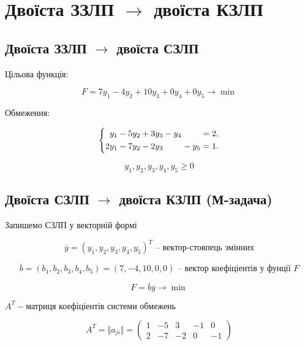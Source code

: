 \documentclass[a4paper, 12pt]{article}
\begin{document}
\section{Двоїста ЗЗЛП $\rightarrow$ двоїста КЗЛП}

\subsection{Двоїста ЗЗЛП $\rightarrow$ двоїста СЗЛП}


Цільова функція:

\begin{equation*}
F = 7y_1 - 4y_2 + 10y_3 + 0y_4 + 0y_5 \rightarrow \min
\end{equation*}

Обмеження:

\begin{equation*}
\left\{
\begin{aligned}
	y_1 &- 5y_2 + 3y_3 - y_4 \textcolor{white}{+ 0y_5} = 2,\\
	2y_1 &- 7y_2 - 2y_3 \textcolor{white}{+ 0y_4} - y_5 = 1.
\end{aligned}
\right.
\end{equation*}

\[ y_1, y_2, y_3, y_4, y_5 \geq 0 \]


\subsection{Двоїста СЗЛП $\rightarrow$ двоїста КЗЛП (М-задача)}

Запишемо СЗЛП у векторній формі

\begin{equation*}
\overline{y} = \left(y_1, y_2, y_3, y_4, y_5\right)^T \text{ -- вектор-стовпець змінних}
\end{equation*}

\begin{equation*}
\overline{b} = \left(b_1, b_2, b_3, b_4, b_5\right) = (7,-4,10,0,0) \text{ -- вектор коефіціентів у фунції } F
\end{equation*}

\begin{equation*}
F = \overline{b}\overline{y} \rightarrow \min
\end{equation*}

$A^T - \text{матриця коефіціентів системи обмежень}$

\begin{equation*}
 A^T = \Vert a_{ji} \Vert = 
\begin{pmatrix}
	1 & -5 & 3 & -1 & 0\\
	2 & -7 & -2 & 0 & -1
\end{pmatrix}
\end{equation*}
\end{document}
